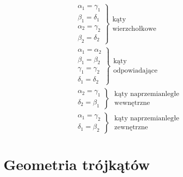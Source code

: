\begin{gather}
  \left.
  \begin{gathered}
    \alpha_1 = \gamma_1\\
    \beta_1 = \delta_1\\
    \alpha_2 = \gamma_2\\
    \beta_2 = \delta_2
  \end{gathered}
  \right\}  %
  \begin{gathered}
    \text{kąty}\\
    \text{wierzchołkowe}
  \end{gathered}
  \\
  \left.
  \begin{gathered}
    \alpha_1 = \alpha_2\\
    \beta_1 = \beta_2\\
    \gamma_1 = \gamma_2\\
    \delta_1 = \delta_2
  \end{gathered}
  \right\}  %
  \begin{gathered}
    \text{kąty}\\
    \text{odpowiadające}
  \end{gathered}
  \\
  \left.
  \begin{gathered}
    \alpha_2 = \gamma_1\\
    \delta_2 = \beta_1
  \end{gathered}
  \right\}\;  %
  \begin{gathered}
    \text{kąty naprzemianległe}\\
    \text{wewnętrzne}
  \end{gathered}
  \\
  \left.
  \begin{gathered}
    \alpha_1 = \gamma_2\\
    \delta_1 = \beta_2
  \end{gathered}
  \right\}\;  %
  \begin{gathered}
    \text{kąty naprzemianległe}\\
    \text{zewnętrzne}
  \end{gathered}
\end{gather}

\begin{theorem}
\end{theorem}

\section{Geometria trójkątów}

